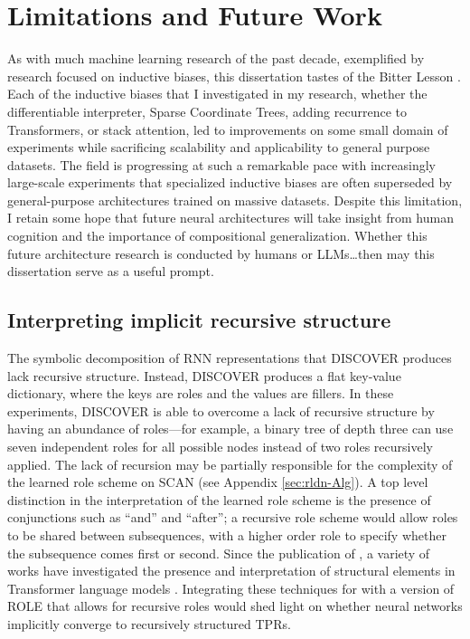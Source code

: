 \section{Limitations and Future Work}

As with much machine learning research of the past decade, exemplified by research focused on inductive biases, this dissertation tastes of the Bitter Lesson \citep{Sutton2019BitterLesson}. Each of the inductive biases that I investigated in my research, whether the differentiable interpreter, Sparse Coordinate Trees, adding recurrence to Transformers, or stack attention, led to improvements on some small domain of experiments while sacrificing scalability and applicability to general purpose datasets. The field is progressing at such a remarkable pace with increasingly large-scale experiments that specialized inductive biases are often superseded by general-purpose architectures trained on massive datasets. Despite this limitation, I retain some hope that future neural architectures will take insight from human cognition and the importance of compositional generalization. Whether this future architecture research is conducted by humans or LLMs\ldots then may this dissertation serve as a useful prompt.

\subsection{Interpreting implicit recursive structure}
The symbolic decomposition of RNN representations that DISCOVER produces lack recursive structure. Instead, DISCOVER produces a flat key-value dictionary, where the keys are roles and the values are fillers. In these experiments, DISCOVER is able to overcome a lack of recursive structure by having an abundance of roles—for example, a binary tree of depth three can use seven independent roles for all possible nodes instead of two roles recursively applied. The lack of recursion may be partially responsible for the complexity of the learned role scheme on SCAN (see Appendix \ref{sec:rldn-Alg}). A top level distinction in the interpretation of the learned role scheme is the presence of conjunctions such as ``and'' and ``after''; a recursive role scheme would allow roles to be shared between subsequences, with a higher order role to specify whether the subsequence comes first or second. Since the publication of \citet{soulos-etal-2020-discovering}, a variety of works have investigated the presence and interpretation of structural elements in Transformer language models \citep{hewitt2019structural,murty2022characterizing,murty2023grokking}. Integrating these techniques for with a version of ROLE that allows for recursive roles would shed light on whether neural networks implicitly converge to recursively structured TPRs.

